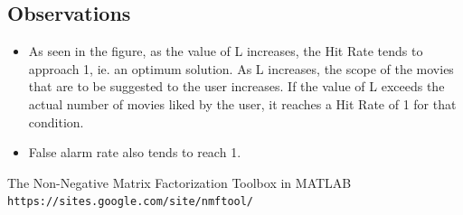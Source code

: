 \documentclass[12pt, onecolumn]{IEEEtran}
\begin{document}
\newpage
\subsection*{Observations}
\begin{itemize}
\item As seen in the figure, as the value of L increases, the Hit Rate tends to approach 1, ie. an optimum solution. As L increases, the scope of the movies that are to be suggested to the user increases. If the value of L exceeds the actual number of movies liked by the user, it reaches a Hit Rate of 1 for that condition.
\item False alarm rate also tends to reach 1. 
\end{itemize}

\begin{thebibliography}{1}

The Non-Negative Matrix Factorization Toolbox in MATLAB \texttt{ https://sites.google.com/site/nmftool/}

\end{thebibliography}
\end{document}
